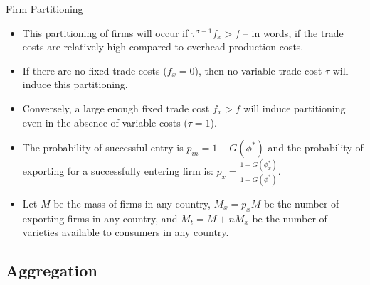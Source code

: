 \documentclass[aspectratio=169]{beamer}
\begin{document}

\begin{frame}{Firm Partitioning}

\begin{itemize}
    \item<1-> This partitioning of firms will occur if $ \tau^{\sigma - 1} f_{x} > f $ -- in words, if the trade costs are relatively high compared to overhead production costs.
    \item<2-> If there are no fixed trade costs ($ f_{x} = 0 $), then no variable trade cost $ \tau $ will induce this partitioning.
    \item<3-> Conversely, a large enough fixed trade cost $ f_{x} > f $ will induce partitioning even in the absence of variable costs ($ \tau = 1 $).
    \item<4-> The probability of successful entry is $ p_{in} = 1 - G\left( \phi^{*} \right) $ and the probability of exporting for a successfully entering firm is: $ p_{x} = \frac{1 - G\left( \phi_{x}^{*} \right)}{1 - G\left( \phi^{*} \right)} $.
    \item<5-> Let $ M $ be the mass of firms in any country, $ M_{x} = p_{x}M $ be the number of exporting firms in any country, and $ M_{t} = M + nM_{x} $ be the number of varieties available to consumers in any country.
\end{itemize}
    
\end{frame}


\subsection{Aggregation}

\end{document}
